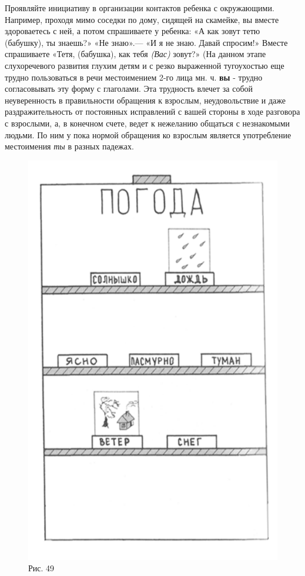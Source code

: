 \documentclass{book}
\renewcommand{\emph}[1]{\textit{#1}}
\begin{document}
Проявляйте инициативу в организации контактов ребенка с окружающими.
Например, проходя мимо соседки по дому, сидящей на скамейке, вы вместе
здороваетесь с ней, а потом спрашиваете у ребенка: «А как зовут тетю
(бабушку), ты знаешь?» «Не знаю».--- «И я не знаю. Давай спросим!»
Вместе спрашиваете «Тетя, (бабушка), как тебя \emph{(Вас)} зовут?» (На
данном этапе слухоречевого развития глухим детям и с резко выраженной
тугоухостью еще трудно пользоваться в речи местоимением 2-го лица мн. ч.
\textbf{вы} - трудно согласовывать эту форму с глаголами. Эта трудность
влечет за собой неуверенность в правильности обращения к взрослым,
неудовольствие и даже раздражительность от постоянных исправлений с
вашей стороны в ходе разговора с взрослыми, а, в конечном счете, ведет к
нежеланию общаться с незнакомыми людьми. По ним у пока нормой обращения
ко взрослым является употребление местоимения \emph{ты} в разных
падежах.

\begin{figure}
\centering
\includegraphics[width=0.9\linewidth]{media/media/image45.png}
\caption*{Рис. 49}
\end{figure}
\end{document}
